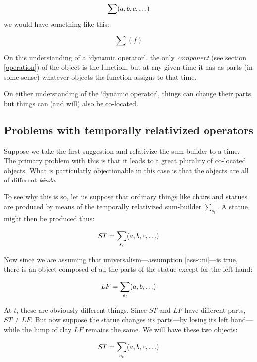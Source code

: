 \documentclass[11pt]{article}
\begin{document}
\begin{spacing}{1.5}
\begin{displaymath}
\sum (a, b, c, \mathellipsis )
\end{displaymath}
we would have something like this:

\begin{displaymath}
\sum ( f )
\end{displaymath}

On this understanding of a `dynamic operator', the only {\em
  component} (see section \ref{operation}) of the object is the
function, but at any given time it has as parts (in some sense)
whatever objects the function assigns to that time.

On either understanding of the `dynamic operator', things can change
their parts, but things can (and will) also be co-located.

\subsection{Problems with temporally relativized operators}
\label{problems2a}
Suppose we take the first suggestion and relativize the sum-builder to
a time.  The primary problem with this is that it leads to a great
plurality of co-located objects.  What is particularly objectionable
in this case is that the objects are all of different {\em kinds}.

To see why this is so, let us suppose that ordinary things like chairs
and statues are produced by means of the temporally relativized
sum-builder $\sum_{s_t}$.  A statue might then be produced thus:

\begin{displaymath}
ST = \sum_{s_t} (a, b, c, \mathellipsis )
\end{displaymath}

Now since we are assuming that universalism---assumption
\ref{ass-uni}---is true, there is an object composed of all the parts
of the statue except for the left hand:

\begin{displaymath}
LF = \sum_{s_t} (a, b, \mathellipsis )
\end{displaymath}

At $t$, these are obviously different things.  Since $ST$ and $LF$
have different parts, $ST \neq LF$.  But now suppose the statue
changes its parts---by losing its left hand---while the lump of clay
$LF$ remains the same.  We will have these two objects:

\begin{displaymath}
ST = \sum_{s_t} (a, b, c, \mathellipsis )
\end{displaymath}


\end{spacing}
\end{document}
